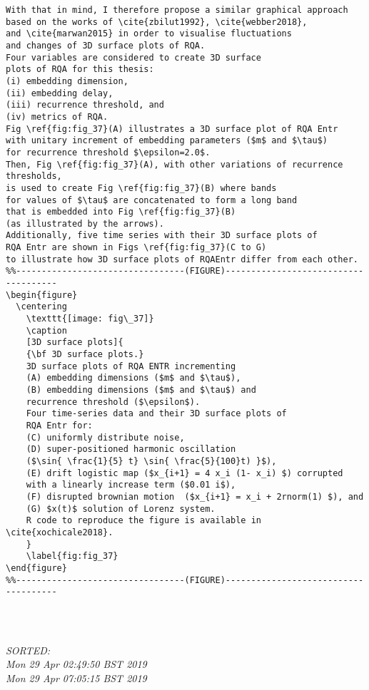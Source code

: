 \documentclass[12pt]{article}
\begin{document}
\begin{enumerate}
\begin{verbatim}
With that in mind, I therefore propose a similar graphical approach 
based on the works of \cite{zbilut1992}, \cite{webber2018}, 
and \cite{marwan2015} in order to visualise fluctuations 
and changes of 3D surface plots of RQA.
Four variables are considered to create 3D surface 
plots of RQA for this thesis: 
(i) embedding dimension,
(ii) embedding delay,
(iii) recurrence threshold, and 
(iv) metrics of RQA. 
Fig \ref{fig:fig_37}(A) illustrates a 3D surface plot of RQA Entr  
with unitary increment of embedding parameters ($m$ and $\tau$)
for recurrence threshold $\epsilon=2.0$.
Then, Fig \ref{fig:fig_37}(A), with other variations of recurrence thresholds, 
is used to create Fig \ref{fig:fig_37}(B) where bands 
for values of $\tau$ are concatenated to form a long band
that is embedded into Fig \ref{fig:fig_37}(B) 
(as illustrated by the arrows).
Additionally, five time series with their 3D surface plots of 
RQA Entr are shown in Figs \ref{fig:fig_37}(C to G)
to illustrate how 3D surface plots of RQAEntr differ from each other.
%%---------------------------------(FIGURE)-------------------------------------
\begin{figure}
  \centering
    \texttt{[image: fig\_37]}
    \caption
	[3D surface plots]{
	{\bf 3D surface plots.} 
	3D surface plots of RQA ENTR incrementing 
	(A) embedding dimensions ($m$ and $\tau$),
	(B) embedding dimensions ($m$ and $\tau$) and
	recurrence threshold ($\epsilon$).
	Four time-series data and their 3D surface plots of 
	RQA Entr for:
	(C) uniformly distribute noise,
	(D) super-positioned harmonic oscillation 
	($\sin{ \frac{1}{5} t} \sin{ \frac{5}{100}t) }$),
	(E) drift logistic map ($x_{i+1} = 4 x_i (1- x_i) $) corrupted 
	with a linearly increase term ($0.01 i$),
	(F) disrupted brownian motion  ($x_{i+1} = x_i + 2rnorm(1) $), and
	(G) $x(t)$ solution of Lorenz system.
	R code to reproduce the figure is available in \cite{xochicale2018}.
	}
    \label{fig:fig_37}
\end{figure}
%%---------------------------------(FIGURE)-------------------------------------




	\end{verbatim}
	\textit{
	SORTED:  \\
	Mon 29 Apr 02:49:50 BST 2019\\
	Mon 29 Apr 07:05:15 BST 2019
	}
	\\



\end{enumerate}
\end{document}
